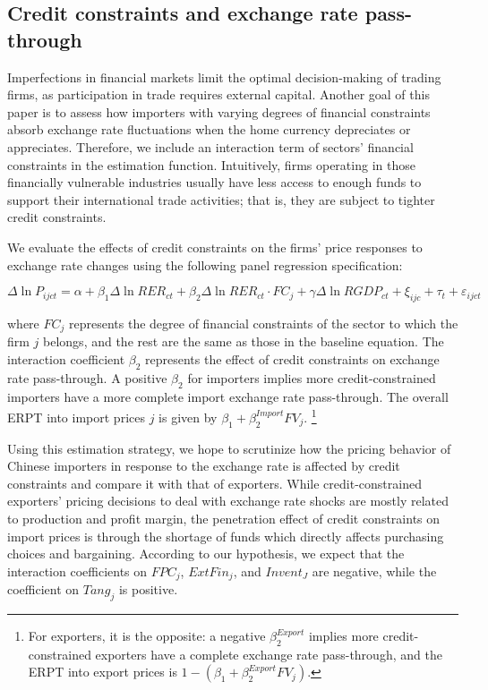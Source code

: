 \documentclass[12pt]{article}
\begin{document}
\subsection{Credit constraints and exchange rate pass-through} \label{Empirical-Credit}

Imperfections in financial markets limit the optimal decision-making of trading firms, as participation in trade requires external capital. Another goal of this paper is to assess how importers with varying degrees of financial constraints absorb exchange rate fluctuations when the home currency depreciates or appreciates. Therefore, we include an interaction term of sectors’ financial constraints in the estimation function. Intuitively, firms operating in those financially vulnerable industries usually have less access to enough funds to support their international trade activities; that is, they are subject to tighter credit constraints. 

We evaluate the effects of credit constraints on the firms' price responses to exchange rate changes using the following panel regression specification:

\begin{equation}
	\Delta \ln P_{ijct}=\alpha+\beta_{1} \Delta \ln RER_{ct}+\beta_{2} \Delta \ln RER_{ct} \cdot FC_{j}+\gamma \Delta \ln RGDP_{ct}+\xi_{ijc}+\tau_{t} +\varepsilon_{ijct}
	\label{eq.credit}
\end{equation}

where $FC_{j}$ represents the degree of financial constraints of the sector to which the firm $j$ belongs, and the rest are the same as those in the baseline equation. The interaction coefficient $\beta_2$ represents the effect of credit constraints on exchange rate pass-through. A positive $\beta_2$ for importers implies more credit-constrained importers have a more complete import exchange rate pass-through. The overall ERPT into import prices $j$ is given by $\beta_{1} +\beta^{Import}_{2} FV_j$. \footnote{For exporters, it is the opposite: a negative $\beta^{Export}_2$ implies more credit-constrained exporters have a complete exchange rate pass-through, and the ERPT into export prices is $1-(\beta_{1} +\beta^{Export}_{2} FV_j)$.}

Using this estimation strategy, we hope to scrutinize how the pricing behavior of Chinese importers in response to the exchange rate is affected by credit constraints and compare it with that of exporters. While credit-constrained exporters’ pricing decisions to deal with exchange rate shocks are mostly related to production and profit margin, the penetration effect of credit constraints on import prices is through the shortage of funds which directly affects purchasing choices and bargaining. According to our hypothesis, we expect that the interaction coefficients on $FPC_{j}$, $ExtFin_j$, and $Invent_J$ are negative, while the coefficient on $Tang_j$ is positive.
\end{document}
